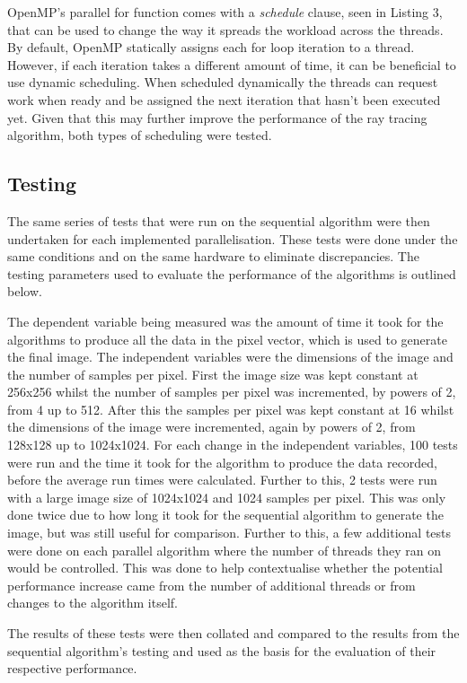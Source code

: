 \documentclass[journal,transmag]{IEEEtran}
\begin{document}
	OpenMP's parallel for function comes with a \textsl{schedule} clause, seen in Listing 3, that can be used to change the way it spreads the workload across the threads. By default, OpenMP statically assigns each for loop iteration to a thread. However, if each iteration takes a different amount of time, it can be beneficial to use dynamic scheduling. When scheduled dynamically the threads can request work when ready and be assigned the next iteration that hasn't been executed yet. Given that this may further improve the performance of the ray tracing algorithm, both types of scheduling were tested.
	
	\subsection{Testing}
	The same series of tests that were run on the sequential algorithm were then undertaken for each implemented parallelisation. These tests were done under the same conditions and on the same hardware to eliminate discrepancies. The testing parameters used to evaluate the performance of the algorithms is outlined below.
	
	The dependent variable being measured was the amount of time it took for the algorithms to produce all the data in the pixel vector, which is used to generate the final image. The independent variables were the dimensions of the image and the number of samples per pixel. First the image size was kept constant at 256x256 whilst the number of samples per pixel was incremented, by powers of 2, from 4 up to 512. After this the samples per pixel was kept constant at 16 whilst the dimensions of the image were incremented, again by powers of 2, from 128x128 up to 1024x1024. For each change in the independent variables, 100 tests were run and the time it took for the algorithm to produce the data recorded, before the average run times were calculated. Further to this, 2 tests were run with a large image size of 1024x1024 and 1024 samples per pixel. This was only done twice due to how long it took for the sequential algorithm to generate the image, but was still useful for comparison. Further to this, a few additional tests were done on each parallel algorithm where the number of threads they ran on would be controlled. This was done to help contextualise whether the potential performance increase came from the number of additional threads or from changes to the algorithm itself.
	
	The results of these tests were then collated and compared to the results from the sequential algorithm's testing and used as the basis for the evaluation of	their respective performance.
	
\end{document}
